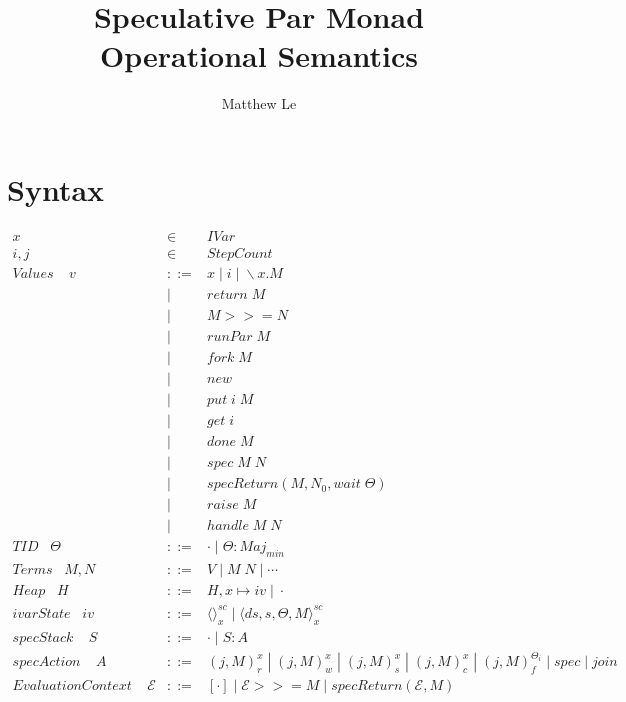 \documentclass[9pt]{article}
\title{Speculative Par Monad Operational Semantics}
\author{Matthew Le}
\begin{document}
\maketitle

\section{Syntax}

\begin{displaymath}
\begin{array}{rcll}
x &\in& IVar \\
i, j &\in& StepCount  \\ 

Values \;\;\;\; v & ::= & x \; | \; i \; | \; \backslash x. M \\
& | & return \; M\\ 
& | & M >>= N\\
& | & runPar \; M \\
& | & fork \; M \\
& | & new \\
& | & put \; i \; M \\
& | & get \; i \\ 
& | & done \; M \\
& | & spec \; M \; N \\
& | & specReturn(M, N_0, wait \; \Theta) \\
& | & raise \; M \\
& | & handle \; M \; N  \\

TID \;\;\; \Theta &::=& \cdot \; | \; \Theta : Maj_{min} \\

Terms \;\;\; M, N &::=&  V \;| \;M \; N \; | \; \cdots\\

Heap \;\;\; H &::=& H, x \mapsto iv \; | \; \cdot \\

ivarState \;\;\; iv &::=& \langle\rangle_x^{sc} \; | \; \langle ds, s, \Theta, M\rangle_x^{sc}\\

specStack \;\;\;\; S &::=& \cdot \; | \; S : A\; \\
specAction \;\;\;\; A &::=& (j, M)_r^x \; | \; (j, M)_w^x \; | \; (j, M)_s^x \; | \; (j, M)_c^x \; | \; (j, M)_f^{\Theta_i} \; | \; spec \; | \; join\\

Evaluation Context \;\;\;\; \mathcal{E} &::=& [\cdot] \; | \; \mathcal{E} >>= M \; | \; specReturn(\mathcal{E}, M) 
\end{array}
\end{displaymath}
\end{document}
